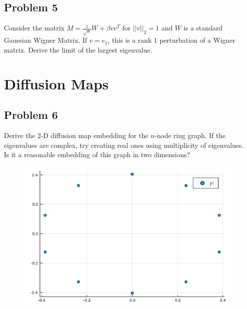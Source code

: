 \documentclass{amsart}
\begin{document}
	\subsection{Problem 5}
	Consider the matrix $M = \frac{1}{\sqrt{n}}W + \beta vv^T$ for $||v||_2=1$ and $W$ is a standard Gaussian Wigner Matrix. If $v=e_1$, this is a rank 1 perturbation of a Wigner matrix. Derive the limit of the largest eigenvalue.
	\\
	\section{Diffusion Maps}
	\subsection{Problem 6}
	Derive the 2-D diffusion map embedding for the $n$-node ring graph. If the eigenvalues are complex, try creating real ones using multiplicity of eigenvalues. Is it a reasonable embedding of this graph in two dimensions?
	
	\begin{figure}[h!]
		\centering
		\includegraphics[width=0.8\linewidth]{diffmap.png}
	\end{figure}
\end{document}
